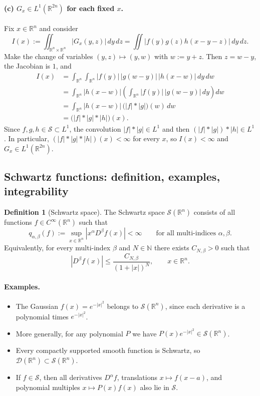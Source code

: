 \documentclass[12pt,a4paper]{article}
\theoremstyle{plain}
\theoremstyle{definition}
\newtheorem{definition}[theorem]{Definition}
\theoremstyle{remark}
\theoremstyle{remark}
\begin{document}
\paragraph{(c) $G_x\in L^1(\mathbb{R}^{2n})$ for each fixed $x$.}
Fix $x\in\mathbb{R}^n$ and consider
\[
I(x) := \iint_{\mathbb{R}^n\times\mathbb{R}^n}
|G_x(y,z)|\,dy\,dz
= \iint |f(y)g(z)h(x-y-z)|\,dy\,dz.
\]
Make the change of variables $(y,z)\mapsto (y,w)$ with $w:=y+z$.
Then $z=w-y$, the Jacobian is $1$, and
\[
\begin{aligned}
	I(x)
	&= \int_{\mathbb{R}^n}\int_{\mathbb{R}^n}
	|f(y)|\,|g(w-y)|\,|h(x-w)|\,dy\,dw \\
	&= \int_{\mathbb{R}^n}
	|h(x-w)|
	\left( \int_{\mathbb{R}^n} |f(y)|\,|g(w-y)|\,dy \right) dw \\
	&= \int_{\mathbb{R}^n}
	|h(x-w)|\,\bigl(|f|*|g|\bigr)(w)\,dw \\
	&= \bigl(|f|*|g|*|h|\bigr)(x).
\end{aligned}
\]
Since $f,g,h\in\mathcal{S}\subset L^1$, the convolution
$|f|*|g|\in L^1$ and then $(|f|*|g|)*|h|\in L^1$. In particular,
$(|f|*|g|*|h|)(x)<\infty$ for every $x$, so $I(x)<\infty$ and
$G_x\in L^1(\mathbb{R}^{2n})$.

\qedhere

\subsection*{Schwartz functions: definition, examples, integrability}

\begin{definition}[Schwartz space]
	The Schwartz space $\mathcal{S}(\mathbb{R}^n)$ consists of all
	functions $f\in C^\infty(\mathbb{R}^n)$ such that
	\[
	q_{\alpha,\beta}(f)
	:= \sup_{x\in\mathbb{R}^n} |x^\alpha D^\beta f(x)| < \infty
	\qquad\text{for all multi-indices }\alpha,\beta.
	\]
	Equivalently, for every multi-index $\beta$ and $N\in\mathbb{N}$ there
	exists $C_{N,\beta}>0$ such that
	\[
	|D^\beta f(x)| \le \frac{C_{N,\beta}}{(1+|x|)^N},
	\qquad x\in\mathbb{R}^n.
	\]
\end{definition}

\paragraph{Examples.}
\begin{itemize}
	\item The Gaussian $f(x)=e^{-|x|^2}$ belongs to $\mathcal{S}(\mathbb{R}^n)$,
	since each derivative is a polynomial times $e^{-|x|^2}$.
	\item More generally, for any polynomial $P$ we have
	$P(x)e^{-|x|^2}\in\mathcal{S}(\mathbb{R}^n)$.
	\item Every compactly supported smooth function is Schwartz, so
	$\mathcal{D}(\mathbb{R}^n)\subset\mathcal{S}(\mathbb{R}^n)$.
	\item If $f\in\mathcal{S}$, then all derivatives $D^\alpha f$,
	translations $x\mapsto f(x-a)$, and polynomial multiples
	$x\mapsto P(x)f(x)$ also lie in $\mathcal{S}$.
\end{itemize}
\end{document}
